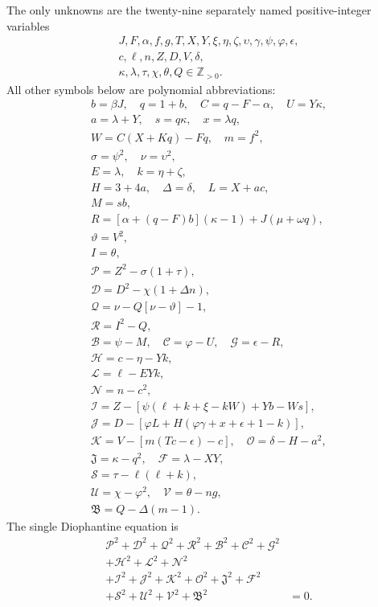 The only unknowns are the twenty-nine separately named positive-integer variables
\[
\begin{gathered}J,F,\alpha,f,g,T,X,Y,\xi,\eta,\zeta,\upsilon,\gamma,\psi,\varphi,\epsilon,\\
c,\ell,n,Z,D,V,\delta,\\
\kappa,\lambda,\tau,\chi,\theta,Q\in\mathbb Z_{>0}.\end{gathered}
\]
All other symbols below are polynomial abbreviations:
\[
\begin{gathered}
b=\beta J,\quad q=1+b,\quad C=q-F-\alpha,\quad U=Y\kappa,\\
a=\lambda+Y,\quad s=q\kappa,\quad x=\lambda q,\\
W=C(X+Kq)-Fq,\quad m=f^2,\\
\sigma=\psi^2,\quad\nu=\upsilon^2,\\
E=\lambda,\quad k=\eta+\zeta,\\
H=3+4a,\quad\Delta=\delta,\quad L=X+ac,\\
M=sb,\\
R=[\alpha+(q-F)b](\kappa-1)+J(\mu+\omega q),\\
\vartheta=V^2,\\
I=\theta,\\
\mathcal{P}=Z^2-\sigma(1+\tau),\\
\mathcal{D}=D^2-\chi(1+\Delta n),\\
\mathcal{Q}=\nu-Q[\nu-\vartheta]-1,\\
\mathcal{R}=I^2-Q,\\
\mathcal{B}=\psi-M,\quad \mathcal{C}=\varphi-U,\quad \mathcal{G}=\epsilon-R,\\
\mathcal{H}=c-\eta-Yk,\\
\mathcal{L}=\ell-EYk,\\
\mathcal{N}=n-c^2,\\
\mathcal{I}=Z-[\psi(\ell+k+\xi-kW)+Yb-Ws],\\
\mathcal{J}=D-[\varphi L+H(\varphi\gamma+x+\epsilon+1-k)],\\
\mathcal{K}=V-[m(Tc-\epsilon)-c],\quad\mathcal{O}=\delta-H-a^2,\\
\mathfrak{J}=\kappa-q^2,\quad\mathcal{F}=\lambda-XY,\\
\mathcal{S}=\tau-\ell(\ell+k),\\
\mathcal{U}=\chi-\varphi^2,\quad\mathcal{V}=\theta-ng,\\
\mathfrak{B}=Q-\Delta(m-1).
\end{gathered}
\]
The single Diophantine equation is
\[
\begin{split}
\mathcal{P}^2+\mathcal{D}^2+\mathcal{Q}^2+\mathcal{R}^2+\mathcal{B}^2+\mathcal{C}^2+\mathcal{G}^2 &\\
+\mathcal{H}^2+\mathcal{L}^2+\mathcal{N}^2 &\\
+\mathcal{I}^2+\mathcal{J}^2+\mathcal{K}^2+\mathcal{O}^2+\mathfrak{J}^2+\mathcal{F}^2 &\\
+\mathcal{S}^2+\mathcal{U}^2+\mathcal{V}^2+\mathfrak{B}^2 &= 0.
\end{split}
\]
